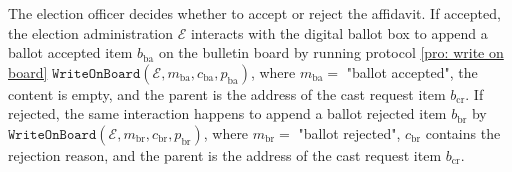 The election officer decides whether to accept or reject the affidavit. If accepted, the election administration $\mathcal{E}$ interacts with the digital ballot box to append a ballot accepted item $b_\mathrm{ba}$ on the bulletin board by running protocol \ref{pro: write on board} $\mathtt{WriteOnBoard}(\mathcal{E}, m_\mathrm{ba}, c_\mathrm{ba}, p_\mathrm{ba})$, where $m_\mathrm{ba} = $ "ballot accepted", the content is empty, and the parent is the address of the cast request item $b_\mathrm{cr}$. If rejected, the same interaction happens to append a ballot rejected item $b_\mathrm{br}$ by $\mathtt{WriteOnBoard}(\mathcal{E}, m_\mathrm{br}, c_\mathrm{br}, p_\mathrm{br})$, where $m_\mathrm{br} = $ "ballot rejected", $c_\mathrm{br}$ contains the rejection reason, and the parent is the address of the cast request item $b_\mathrm{cr}$.


